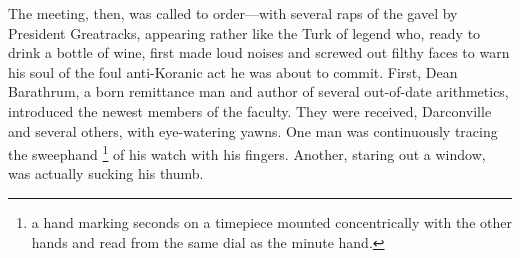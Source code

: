   The meeting, then, was called to order---with several raps 
of the gavel 
by President Greatracks, appearing rather like the Turk of legend who, ready to
drink a bottle of wine, first made loud noises and screwed out filthy faces to
warn his soul of the foul anti-Koranic act he was about to commit. First, Dean
Barathrum, a born remittance man 
and author of several out-of-date arithmetics,
introduced the newest members of the faculty. They were received, Darconville
and several others, with eye-watering yawns. 
One man was continuously tracing the sweephand 
\footnote{a hand marking seconds on a timepiece mounted concentrically with the
  other hands and read from the same dial as the minute hand.}
of his watch with his fingers. Another, staring out a window, was
actually sucking his thumb.

